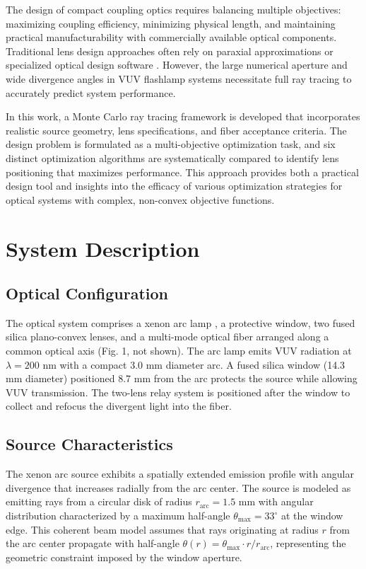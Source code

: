 The design of compact coupling optics requires balancing multiple objectives: maximizing coupling efficiency, minimizing physical length, and maintaining practical manufacturability with commercially available optical components. Traditional lens design approaches often rely on paraxial approximations or specialized optical design software \cite{greivenkamp2004}. However, the large numerical aperture and wide divergence angles in VUV flashlamp systems necessitate full ray tracing to accurately predict system performance.

In this work, a Monte Carlo ray tracing framework is developed that incorporates realistic source geometry, lens specifications, and fiber acceptance criteria. The design problem is formulated as a multi-objective optimization task, and six distinct optimization algorithms are systematically compared to identify lens positioning that maximizes performance. This approach provides both a practical design tool and insights into the efficacy of various optimization strategies for optical systems with complex, non-convex objective functions.

\section{System Description}

\subsection{Optical Configuration}

The optical system comprises a xenon arc lamp \cite{accuglass}, a protective window, two fused silica plano-convex lenses, and a multi-mode optical fiber arranged along a common optical axis (Fig. 1, not shown). The arc lamp emits VUV radiation at $\lambda = 200$ nm with a compact 3.0 mm diameter arc. A fused silica window (14.3 mm diameter) positioned 8.7 mm from the arc protects the source while allowing VUV transmission. The two-lens relay system is positioned after the window to collect and refocus the divergent light into the fiber.

\subsection{Source Characteristics}

The xenon arc source exhibits a spatially extended emission profile with angular divergence that increases radially from the arc center. The source is modeled as emitting rays from a circular disk of radius $r_{\text{arc}} = 1.5$ mm with angular distribution characterized by a maximum half-angle $\theta_{\max} = 33^\circ$ at the window edge. This coherent beam model assumes that rays originating at radius $r$ from the arc center propagate with half-angle $\theta(r) = \theta_{\max} \cdot r/r_{\text{arc}}$, representing the geometric constraint imposed by the window aperture.

